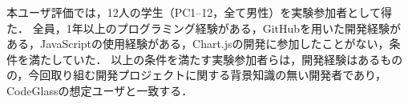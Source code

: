 





本ユーザ評価では，12人の学生（PC1--12，全て男性）を実験参加者として得た．
全員，1年以上のプログラミング経験がある，GitHubを用いた開発経験がある，JavaScriptの使用経験がある，Chart.jsの開発に参加したことがない，条件を満たしていた．
以上の条件を満たす実験参加者らは，開発経験はあるものの，今回取り組む開発プロジェクトに関する背景知識の無い開発者であり，CodeGlassの想定ユーザと一致する．



